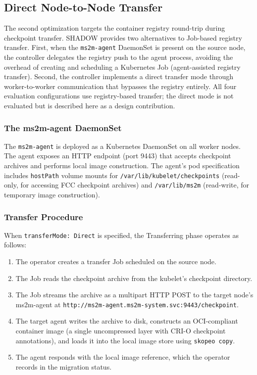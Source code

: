 \documentclass[conference]{IEEEtran}
\begin{document}
\subsection{Direct Node-to-Node Transfer}
\label{sec:direct-transfer}

The second optimization targets the container registry round-trip during
checkpoint transfer. SHADOW provides two alternatives to Job-based registry
transfer. First, when the \texttt{ms2m-agent} DaemonSet is present on the
source node, the controller delegates the registry push to the agent process,
avoiding the overhead of creating and scheduling a Kubernetes Job (agent-assisted
registry transfer). Second, the controller implements a direct transfer mode
through worker-to-worker communication that bypasses the registry entirely.
All four evaluation configurations use registry-based transfer; the direct
mode is not evaluated but is described here as a design contribution.

\subsubsection{The ms2m-agent DaemonSet}
\label{sec:agent}

The \texttt{ms2m-agent} is deployed as a Kubernetes DaemonSet on all worker nodes.
The agent exposes an HTTP endpoint (port 9443) that accepts checkpoint archives
and performs local image construction. The agent's pod specification includes
\texttt{hostPath} volume mounts for \texttt{/var/lib/kubelet/checkpoints}
(read-only, for accessing FCC checkpoint archives) and \texttt{/var/lib/ms2m}
(read-write, for temporary image construction).

\subsubsection{Transfer Procedure}
\label{sec:transfer-procedure}

When \texttt{transferMode: Direct} is specified, the Transferring phase operates
as follows:

\begin{enumerate}
\item The operator creates a transfer Job scheduled on the source node.
\item The Job reads the checkpoint archive from the kubelet's checkpoint
  directory.
\item The Job streams the archive as a multipart HTTP POST to the target
  node's ms2m-agent at
  \texttt{http://ms2m-agent.ms2m-system.svc:9443/checkpoint}.
\item The target agent writes the archive to disk, constructs an
  OCI-compliant container image (a single uncompressed layer with CRI-O
  checkpoint annotations), and loads it into the local image store using
  \texttt{skopeo copy}.
\item The agent responds with the local image reference, which the operator
  records in the migration status.
\end{enumerate}
\end{document}
